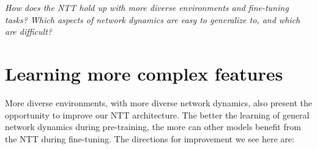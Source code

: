 \emph{How does the NTT hold up with more diverse environments and fine-tuning tasks? Which aspects of network dynamics are easy to generalize to, and which are difficult?}

\section{Learning more complex features}
\label{sec:compftt}

More diverse environments, \ie with more diverse network dynamics, also present the opportunity to improve our NTT architecture. The better the learning of general network dynamics during pre-training, the more can other models benefit from the NTT during fine-tuning. The directions for improvement we see here are: 

